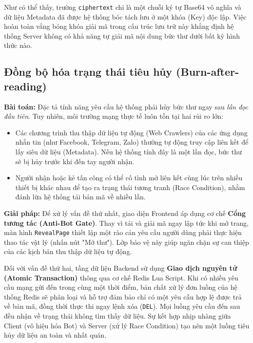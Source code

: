 Như có thể thấy, trường \texttt{ciphertext} chỉ là một chuỗi ký tự Base64 vô nghĩa và dữ liệu Metadata đã được hệ thống bóc tách lưu ở một khóa (Key) độc lập. Việc hoàn toàn vắng bóng khóa giải mã trong cấu trúc lưu trữ này khẳng định hệ thống Server không có khả năng tự giải mã nội dung bức thư dưới bất kỳ hình thức nào.

\subsection[Đồng bộ hóa trạng thái tiêu hủy]{Đồng bộ hóa trạng thái tiêu hủy (Burn-after-reading)}

\textbf{Bài toán:} Đặc tả tính năng yêu cầu hệ thống phải hủy bức thư ngay sau \textit{lần đọc đầu tiên}. Tuy nhiên, môi trường mạng thực tế luôn tồn tại hai rủi ro lớn:
\begin{itemize}
    \item Các chương trình thu thập dữ liệu tự động (Web Crawlers) của các ứng dụng nhắn tin (như Facebook, Telegram, Zalo) thường tự động truy cập liên kết để lấy siêu dữ liệu (Metadata). Nếu hệ thống tính đây là một lần đọc, bức thư sẽ bị hủy trước khi đến tay người nhận.
    \item Người nhận hoặc kẻ tấn công có thể cố tình mở liên kết cùng lúc trên nhiều thiết bị khác nhau để tạo ra trạng thái tương tranh (Race Condition), nhằm đánh lừa hệ thống tải bản mã về nhiều lần.
\end{itemize}

\textbf{Giải pháp:} Để xử lý vấn đề thứ nhất, giao diện Frontend áp dụng cơ chế \textbf{Cổng tương tác (Anti-Bot Gate)}. Thay vì tải và giải mã ngay lập tức khi mở trang, màn hình \texttt{RevealPage} thiết lập một rào cản yêu cầu người dùng phải thực hiện thao tác vật lý (nhấn nút "Mở thư"). Lớp bảo vệ này giúp ngăn chặn sự can thiệp của các kịch bản thu thập dữ liệu tự động.

Đối với vấn đề thứ hai, tầng dữ liệu Backend sử dụng \textbf{Giao dịch nguyên tử (Atomic Transaction)} thông qua cơ chế Redis Lua Script. Khi có nhiều yêu cầu mạng gửi đến trong cùng một thời điểm, bản chất xử lý đơn luồng của hệ thống Redis sẽ phân loại và hỗ trợ đảm bảo chỉ có một yêu cầu hợp lệ được trả về bản mã, đồng thời thực thi ngay lệnh xóa (\texttt{DEL}). Mọi luồng yêu cầu đến sau đều nhận về trạng thái không tìm thấy dữ liệu. Sự kết hợp nhịp nhàng giữa Client (vô hiệu hóa Bot) và Server (xử lý Race Condition) tạo nên một luồng tiêu hủy dữ liệu an toàn và nhất quán.